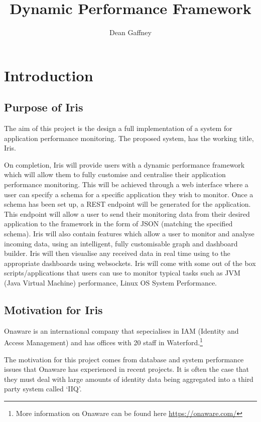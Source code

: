 \documentclass[12pt,a4paper,titlepage]{report}
\begin{document}
\title{Dynamic Performance Framework}
\author{Dean Gaffney}
\maketitle

\tableofcontents
\listoftables
\listoffigures

\chapter{Introduction}

\section{Purpose of Iris}
The aim of this project is the design a full implementation of a system for application performance monitoring. The proposed system, has the working title,  Iris. 

On completion, Iris will provide users with a dynamic performance framework which will allow them to fully customise and centralise their application performance monitoring. This will be achieved through a web interface where a user can specify a schema for a specific application they wish to monitor. Once a schema has been set up, a REST endpoint will be generated for the application. This endpoint will allow a user to send their monitoring data from their desired application to the framework in the form of JSON (matching the specified schema). Iris will also contain features which allow a user to monitor and analyse incoming data, using an intelligent, fully customisable graph and dashboard builder. Iris will then visualise any received data in real time using to the appropriate dashboards using websockets. Iris will come with some out of the box scripts/applications that users can use to monitor typical tasks such as JVM (Java Virtual Machine) performance, Linux OS System Performance.

\section{Motivation for Iris}

Onaware is an international company that sepecialises in IAM (Identity and Access Management) and has offices with 20 staff in Waterford.\footnote{More information on Onaware can be found here \url{https://onaware.com/}}

The motivation for this project comes from database and system performance issues that Onaware has experienced in recent projects. It is often the case that they must deal with large amounts of identity data being aggregated into a third party system called ‘IIQ’. 
\end{document}
